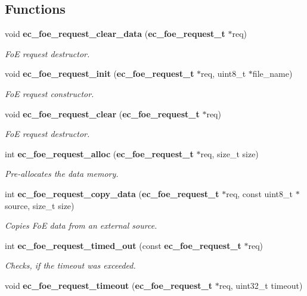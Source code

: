 \subsection*{Functions}
\begin{DoxyCompactItemize}
\item 
void {\bf ec\-\_\-foe\-\_\-request\-\_\-clear\-\_\-data} ({\bf ec\-\_\-foe\-\_\-request\-\_\-t} $\ast$req)
\begin{DoxyCompactList}\small\item\em Fo\-E request destructor. \end{DoxyCompactList}\item 
void {\bf ec\-\_\-foe\-\_\-request\-\_\-init} ({\bf ec\-\_\-foe\-\_\-request\-\_\-t} $\ast$req, uint8\-\_\-t $\ast$file\-\_\-name)
\begin{DoxyCompactList}\small\item\em Fo\-E request constructor. \end{DoxyCompactList}\item 
void {\bf ec\-\_\-foe\-\_\-request\-\_\-clear} ({\bf ec\-\_\-foe\-\_\-request\-\_\-t} $\ast$req)
\begin{DoxyCompactList}\small\item\em Fo\-E request destructor. \end{DoxyCompactList}\item 
int {\bf ec\-\_\-foe\-\_\-request\-\_\-alloc} ({\bf ec\-\_\-foe\-\_\-request\-\_\-t} $\ast$req, size\-\_\-t size)
\begin{DoxyCompactList}\small\item\em Pre-\/allocates the data memory. \end{DoxyCompactList}\item 
int {\bf ec\-\_\-foe\-\_\-request\-\_\-copy\-\_\-data} ({\bf ec\-\_\-foe\-\_\-request\-\_\-t} $\ast$req, const uint8\-\_\-t $\ast$source, size\-\_\-t size)
\begin{DoxyCompactList}\small\item\em Copies Fo\-E data from an external source. \end{DoxyCompactList}\item 
int {\bf ec\-\_\-foe\-\_\-request\-\_\-timed\-\_\-out} (const {\bf ec\-\_\-foe\-\_\-request\-\_\-t} $\ast$req)
\begin{DoxyCompactList}\small\item\em Checks, if the timeout was exceeded. \end{DoxyCompactList}\item 
void {\bf ec\-\_\-foe\-\_\-request\-\_\-timeout} ({\bf ec\-\_\-foe\-\_\-request\-\_\-t} $\ast$req, uint32\-\_\-t timeout)

\end{DoxyCompactItemize}
